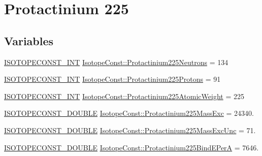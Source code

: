 \hypertarget{group___isotope_const-_protactinium-_pa225}{}\section{Protactinium 225}
\label{group___isotope_const-_protactinium-_pa225}
\subsection*{Variables}
\begin{DoxyCompactItemize}
\item 
\mbox{\hyperlink{group___isotope_const-_macros_ga5f18360b3e99483a35c32d789e62621c}{I\+S\+O\+T\+O\+P\+E\+C\+O\+N\+S\+T\+\_\+\+I\+NT}} \mbox{\hyperlink{group___isotope_const-_protactinium-_pa225_ga7bf0c3acf43b989ed2c950b3cf1cb5d8}{Isotope\+Const\+::\+Protactinium225\+Neutrons}} = 134
\item 
\mbox{\hyperlink{group___isotope_const-_macros_ga5f18360b3e99483a35c32d789e62621c}{I\+S\+O\+T\+O\+P\+E\+C\+O\+N\+S\+T\+\_\+\+I\+NT}} \mbox{\hyperlink{group___isotope_const-_protactinium-_pa225_gaaa4a3070fa82cb892bbdaaa48b097d33}{Isotope\+Const\+::\+Protactinium225\+Protons}} = 91
\item 
\mbox{\hyperlink{group___isotope_const-_macros_ga5f18360b3e99483a35c32d789e62621c}{I\+S\+O\+T\+O\+P\+E\+C\+O\+N\+S\+T\+\_\+\+I\+NT}} \mbox{\hyperlink{group___isotope_const-_protactinium-_pa225_gaa08b614a0fcbaafb5208a43033da18df}{Isotope\+Const\+::\+Protactinium225\+Atomic\+Weight}} = 225
\item 
\mbox{\hyperlink{group___isotope_const-_macros_ga8f45a7272ce02c0b4c65c44636ed719a}{I\+S\+O\+T\+O\+P\+E\+C\+O\+N\+S\+T\+\_\+\+D\+O\+U\+B\+LE}} \mbox{\hyperlink{group___isotope_const-_protactinium-_pa225_ga97422d59eee972eadd18be8389ae8397}{Isotope\+Const\+::\+Protactinium225\+Mass\+Exc}} = 24340.
\item 
\mbox{\hyperlink{group___isotope_const-_macros_ga8f45a7272ce02c0b4c65c44636ed719a}{I\+S\+O\+T\+O\+P\+E\+C\+O\+N\+S\+T\+\_\+\+D\+O\+U\+B\+LE}} \mbox{\hyperlink{group___isotope_const-_protactinium-_pa225_ga926b9f4af2761149aa2c81a36055d523}{Isotope\+Const\+::\+Protactinium225\+Mass\+Exc\+Unc}} = 71.
\item 
\mbox{\hyperlink{group___isotope_const-_macros_ga8f45a7272ce02c0b4c65c44636ed719a}{I\+S\+O\+T\+O\+P\+E\+C\+O\+N\+S\+T\+\_\+\+D\+O\+U\+B\+LE}} \mbox{\hyperlink{group___isotope_const-_protactinium-_pa225_gac4edceadadf8f9bb2c2249477c8260c8}{Isotope\+Const\+::\+Protactinium225\+Bind\+E\+PerA}} = 7646.

\end{DoxyCompactItemize}
